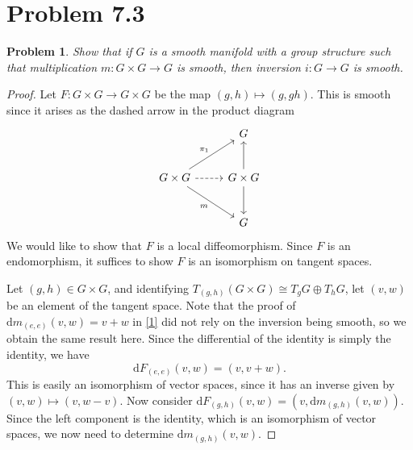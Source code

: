 \documentclass[11pt, letterpaper]{article}
\theoremstyle{plain}
\newtheorem{problem}{Problem}
\begin{document}
\section{Problem 7.3}
\begin{problem}
	Show that if $G$ is a smooth manifold with a group structure such that multiplication $m : G\times G \to G$ is smooth, then inversion $i : G \to G$ is smooth.
\end{problem}
\begin{proof}
	Let $F : G\times G \to G\times G$ be the map $(g,h)\mapsto (g,gh)$. This is smooth since it arises as the dashed arrow in the product diagram
	\[\begin{tikzcd}[row sep = 2.5em, column sep = 2.5em]
	 & G \\
	G\times G\ar[" \pi_1 ", ur] \ar[" m "', dr] \ar[dashed, r]  & G\times G \ar[u] \ar[d]  \\
	 & G
	\end{tikzcd}\]
	We would like to show that $F$ is a local diffeomorphism. Since $F$ is an endomorphism, it suffices to show $F$ is an isomorphism on tangent spaces.

	Let $(g,h)\in G\times G$, and identifying $T_{(g,h)} (G\times G)\cong T_gG\oplus T_hG$, let $(v,w)$ be an element of the tangent space. Note that the proof of $\mathrm{d} m_{(e,e)} (v,w)=v+w$ in \cref{1} did not rely on the inversion being smooth, so we obtain the same result here. Since the differential of the identity is simply the identity, we have
	\[
		\mathrm{d} F_{(e,e)} (v,w)=(v,v+w)
	.\]
	This is easily an isomorphism of vector spaces, since it has an inverse given by $(v,w)\mapsto (v,w-v)$. Now consider $\mathrm{d} F_{(g,h)}(v,w)=(v,\mathrm{d} m_{(g,h)} (v,w)) $. Since the left component is the identity, which is an isomorphism of vector spaces, we now need to determine $\mathrm{d} m_{(g,h)} (v,w)$.


\end{proof}
\end{document}
